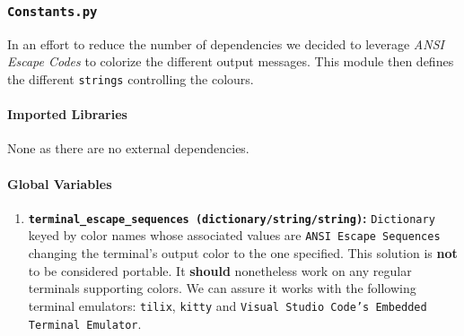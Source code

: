 \subsubsection{\texttt{Constants.py}}
    In an effort to reduce the number of dependencies we decided to leverage \textit{ANSI Escape Codes} to colorize the different output messages. This module then defines the different \texttt{strings} controlling the colours.

    \paragraph{Imported Libraries}
        None as there are no external dependencies.

    \paragraph{Global Variables}
        \begin{enumerate}
            \item \textbf{\texttt{terminal\_escape\_sequences (dictionary/string/string)}:} \texttt{Dictionary} keyed by color names whose associated values are \texttt{ANSI Escape Sequences} changing the terminal's output color to the one specified. This solution is \textbf{not} to be considered portable. It \textbf{should} nonetheless work on any regular terminals supporting colors. We can assure it works with the following terminal emulators: \texttt{tilix}, \texttt{kitty} and \texttt{Visual Studio Code's Embedded Terminal Emulator}.
        \end{enumerate}